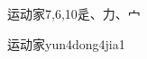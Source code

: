 \begin{entry}{运动家}{7,6,10}{⾡、⼒、⼧}
  \begin{phonetics}{运动家}{yun4dong4jia1}
  \end{phonetics}
\end{entry}

